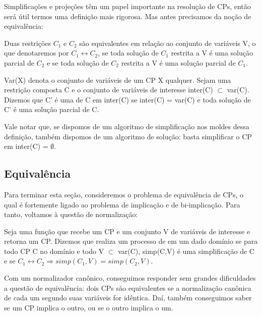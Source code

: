 \documentclass{article}
\begin{document}
Simplificações e projeções têm um papel importante na resolução de
CPs, então será útil termos uma definição mais rigorosa. Mas antes
precisamos da noção de equivalência:

\begin{definition}
  Duas restrições  $C_1$ e $C_2$
  são equivalentes em relação ao conjunto de variáveis V, o que
  denotaremos por $C_1 \leftrightarrow C_2$, se toda solução de $C_1$
  restrita a V é uma solução parcial de $C_2$ e se toda solução de
  $C_2$ restrita a V é uma solução parcial de $C_1$.
\end{definition}

\begin{definition}
  Var(X) denota o conjunto de variáveis de um CP X qualquer. Sejam uma
  restrição composta C e o conjunto de variáveis de interesse inter(C)
  $\subset$ var(C). Dizemos que C' é uma  de
  C em inter(C) se inter(C) = var(C) e toda solução de C' é uma
  solução parcial de C.
\end{definition}

Vale notar que, se dispomos de um algoritmo de simplificação nos
moldes dessa definição, também dispomos de um algoritmo de solução:
basta simplificar o CP em inter(C) = $\emptyset$.

\subsection{Equivalência}

Para terminar esta seção, consideremos o problema de equivalência de
CPs, o qual é fortemente ligado ao problema de implicação e de
bi-implicação. Para tanto, voltamos à questão de normalização:

\begin{definition}
  Seja  uma função que recebe um CP e um conjunto V
  de variáveis de interesse e retorna um CP. Dizemos que
   realiza um processo de  em um dado domínio se para todo CP C no domínio e todo
  V $\subset$ var(C), simp(C,V) é uma simplificação de C e se $C_1
  \leftrightarrow C_2 \Rightarrow simp(C_1,V) = simp(C_2,V)$.
\end{definition}

Com um normalizador canônico, conseguimos responder sem grandes
dificuldades a questão de equivalência: dois CPs são equivalentes se
a normalização canônica de cada um segundo suas variáveis for
idêntica. Daí, também conseguimos saber se um CP implica o outro, ou
se o outro implica o um.
\end{document}
